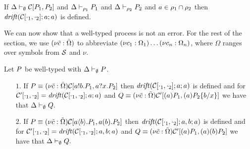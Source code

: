 \begin{lemma}
\label{lem:authpresent}
If $\Delta \vdash_\emptyset \mathcal{C}[P_1,P_2]$ and 
$\Delta \vdash_{\rho_1} P_1$ and $\Delta \vdash_{\rho_2} P_2$
and $a\in\rho_1 \cap \rho_2$ then $ \mathit {drift}(\mathcal{C}[\cdot_1,\cdot_2];a;a)$ is defined.
\end{lemma}

We can now show that a well-typed process is not an error.
For the rest of the section, we use $(\nu \tilde{c}: \tilde{\Omega})$ to abbreviate $(\nu c_1: \Omega_1)\ldots(\nu c_n: \Omega_n)$, where $\Omega$ ranges over symbols from $\cal{S}$
and $\nu$.
\begin{lemma}\label{lemm:error.free}
Let $P$ be well-typed with $\Delta\vdash_\emptyset P$.
\begin{itemize}
\item[$1$.] If $P\equiv (\nu \tilde{c}: \tilde{\Omega})\mathcal{C}[a!b.P_1, a?x.P_2]$ then $ \mathit {drift}(\mathcal{C}[\cdot_1,\cdot_2];a;a)$ is defined and for $\mathcal{C}'[\cdot_1, \cdot_2]= \mathit {drift}(\mathcal{C}[\cdot_1,\cdot_2];a;a)$ and $Q\equiv (\nu \tilde{c}: \tilde{\Omega})\mathcal{C}'[(a)P_1, (a)P_2\{b/x\}]$ we have that $ \Delta\vdash_\emptyset Q.$
\item[$2$.] If $P\equiv (\nu \tilde{c}: \tilde{\Omega})\mathcal{C}[a\langle b\rangle.P_1, a(b).P_2]$ then $ \mathit {drift}(\mathcal{C}[\cdot_1,\cdot_2];a, b;a)$ is defined and for $\mathcal{C}'[\cdot_1, \cdot_2]= \mathit {drift}(\mathcal{C}[\cdot_1,\cdot_2];a, b;a)$ and $Q\equiv (\nu \tilde{c}: \tilde{\Omega})\mathcal{C}'[(a)P_1, (a)(b)P_2]$ we have that $ \Delta\vdash_\emptyset Q.$
\end{itemize}

\end{lemma}

